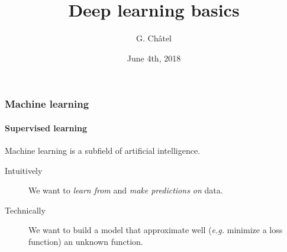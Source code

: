 \documentclass[9pt]{beamer}
\title{Deep learning basics}
\author{G. Châtel}
\date{June 4th, 2018}
\begin{document}
\begin{frame}

  \maketitle

\end{frame}

\begin{frame}

  \frametitle{Machine learning}

  \framesubtitle{Supervised learning}

  Machine learning is a subfield of artificial intelligence.

  \bigskip

  \begin{description}
    \item[Intuitively] We want to \emph{learn from} and \emph{make predictions
    on} data.

    \medskip

    \item[Technically] We want to build a model that approximate well
      (\textit{e.g.} minimize a loss function) an unknown function.
  \end{description}
\end{frame}
\end{document}
